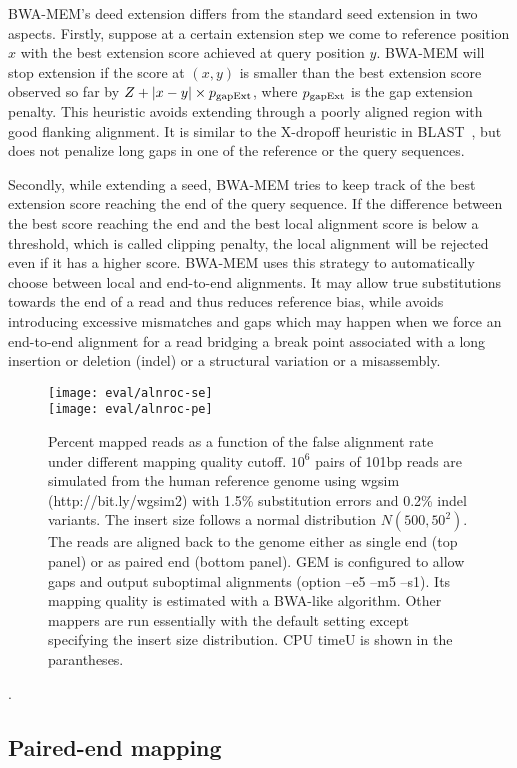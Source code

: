 \documentclass{bioinfo}
\begin{document}
\begin{methods}
BWA-MEM's deed extension differs from the standard seed extension in two
aspects. Firstly, suppose at a certain extension step we come to reference
position $x$ with the best extension score achieved at query position $y$.
BWA-MEM will stop extension if the score at $(x,y)$ is smaller than the best
extension score observed so far by $Z+|x-y|\times p_{\rm gapExt}$, where
$p_{\rm gapExt}$ is the gap extension penalty. This heuristic avoids extending
through a poorly aligned region with good flanking alignment. It is similar
to the X-dropoff heuristic in BLAST~\citep{Altschul:1997vn}, but does not penalize long gaps in
one of the reference or the query sequences.

Secondly, while extending a seed, BWA-MEM tries to keep track of the best
extension score reaching the end of the query sequence. If the difference
between the best score reaching the end and the best local alignment score is
below a threshold, which is called clipping penalty, the local alignment will
be rejected even if it has a higher score. BWA-MEM uses this strategy to
automatically choose between local and end-to-end alignments. It may allow true
substitutions towards the end of a read and thus reduces reference bias, while
avoids introducing excessive mismatches and gaps which may happen when we force
an end-to-end alignment for a read bridging a break point associated with a
long insertion or deletion (indel) or a structural variation or a misassembly.

\begin{figure}[tb]
\centering
\texttt{[image: eval/alnroc-se]}\\
\texttt{[image: eval/alnroc-pe]}
\caption{Percent mapped reads as a function of the false alignment rate under
different mapping quality cutoff. $10^6$ pairs of 101bp reads are simulated
from the human reference genome using wgsim (http://bit.ly/wgsim2) with 1.5\%
substitution errors and 0.2\% indel variants. The insert size follows a normal
distribution $N(500,50^2)$. The reads are aligned back to the genome either as
single end (top panel) or as paired end (bottom panel). GEM is configured to
allow gaps and output suboptimal alignments (option --e5 --m5 --s1). Its
mapping quality is estimated with a BWA-like algorithm. Other mappers are run
essentially with the default setting except specifying the insert size
distribution. CPU timeU is shown in the parantheses.} \end{figure}\label{fig:eval}.

\subsection{Paired-end mapping}


\end{methods}
\end{document}
